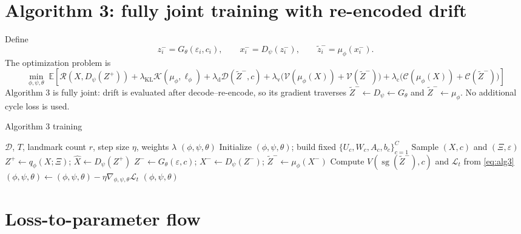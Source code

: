 \documentclass[10pt]{article}
\newcommand{\unique}[1]{\textcolor{algblue}{#1}}
\newcommand{\sg}{\operatorname{sg}}
\begin{document}
\section*{Algorithm 3: fully joint training with re-encoded drift}

Define
\begin{equation}
 z_i^-=G_\theta(\varepsilon_i,c_i),\qquad
 x_i^-=D_\psi(z_i^-),\qquad
 \widetilde z_i^-=\mu_\phi(x_i^-).
\end{equation}
The optimization problem is
\begin{equation}
 \boxed{
 \min_{\phi,\psi,\theta}\;
 \mathbb E\!\left[
 \mathcal R(X,D_\psi(Z^+))
 +\lambda_{\mathrm{KL}}\mathcal K(\mu_\phi,\ell_\phi)
 +\lambda_{\mathrm d}\mathcal D(\widetilde Z^-,c)
 +\lambda_{\mathrm v}\bigl(\mathcal V(\mu_\phi(X))+\mathcal V(\widetilde Z^- )\bigr)
 +\lambda_{\mathrm c}\bigl(\mathcal C(\mu_\phi(X))+\mathcal C(\widetilde Z^- )\bigr)
 \right]
 }
 \label{eq:alg3}
\end{equation}
\noindent
\unique{Algorithm 3 is fully joint: drift is evaluated after decode--re-encode, so its gradient traverses $\widetilde Z^-\leftarrow D_\psi\leftarrow G_\theta$ and $\widetilde Z^-\leftarrow\mu_\phi$. No additional cycle loss is used.}

\begin{algorithm}[H]
\caption{Algorithm 3 training}
\begin{algorithmic}[1]
\Require $\mathcal D$, $T$, landmark count $r$, step size $\eta$, weights $\lambda$
\Ensure $(\phi,\psi,\theta)$
\State Initialize $(\phi,\psi,\theta)$; build fixed $\{U_c,W_c,A_c,b_c\}_{c=1}^C$
    \State Sample $(X,c)$ and $(\Xi,\varepsilon)$
    \State $Z^+\gets q_\phi(X;\Xi)$; $\widehat X\gets D_\psi(Z^+)$
    \State $Z^-\gets G_\theta(\varepsilon,c)$; $X^-\gets D_\psi(Z^-)$; $\widetilde Z^-\gets\mu_\phi(X^-)$
    \State Compute $V(\sg(\widetilde Z^-),c)$ and $\mathcal L_t$ from \eqref{eq:alg3}
    \State $(\phi,\psi,\theta)\gets(\phi,\psi,\theta)-\eta\nabla_{\phi,\psi,\theta}\mathcal L_t$
\EndFor
\State \Return $(\phi,\psi,\theta)$
\end{algorithmic}
\end{algorithm}

\section*{Loss-to-parameter flow}
\end{document}
